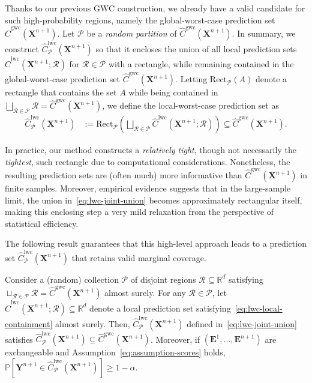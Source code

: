 {Thanks to our previous GWC construction, we already have a valid candidate for such high-probability regions, namely the global-worst-case prediction set $\hat{C}^{\mathrm{gwc}}(\mathbf{X}^{n+1})$. Let $\mathcal{P}$ be a {\em random partition} of $\hat{C}^{\mathrm{gwc}}(\mathbf{X}^{n+1})$. In summary, we construct $\hat{C}^{\mathrm{lwc}}_{\mathcal{P}}(\mathbf{X}^{n+1})$ so that it encloses the union of all local prediction sets $\hat{C}^\mathrm{lwc}(\mathbf{X}^{n+1}; \mathcal{R})$ for $\mathcal{R} \in \mathcal{P}$ with a rectangle, while remaining contained in the global-worst-case prediction set $\hat{C}^{\mathrm{gwc}}(\mathbf{X}^{n+1})$. Letting $\mathrm{Rect}_{\mathcal{P}}(A)$ denote a rectangle that contains the set $A$ while being contained in $\bigsqcup_{\mathcal{R} \in \mathcal{P}}\mathcal{R} = \hat{C}^{\mathrm{gwc}}(\mathbf{X}^{n+1})$, we define the local-worst-case prediction set as
\begin{equation}
    \begin{aligned}
        \hat{C}^{\mathrm{lwc}}_\mathcal{P}(\mathbf{X}^{n+1}) &:= \mathrm{Rect}_{\mathcal{P}}\left(\bigsqcup_{\mathcal{R} \in \mathcal{P}} \hat{C}^\mathrm{lwc}(\mathbf{X}^{n+1}; \mathcal{R})\right) \subseteq \hat{C}^{\mathrm{gwc}}(\mathbf{X}^{n+1}).
    \label{eq:lwc-joint-union}
    \end{aligned}
\end{equation}
}

In practice, our method constructs a {\em relatively tight}, though not necessarily the {\em tightest}, such rectangle due to computational considerations. Nonetheless, the resulting prediction sets are (often much) more informative than $\hat{C}^{\mathrm{gwc}}(\mathbf{X}^{n+1})$ in finite samples. Moreover, empirical evidence suggests that in the large-sample limit, the union in~\eqref{eq:lwc-joint-union} becomes approximately rectangular itself, making this enclosing step a very mild relaxation from the perspective of statistical efficiency.

The following result guarantees that this high-level approach leads to a prediction set $\hat{C}^{\mathrm{lwc}}_\mathcal{P}(\mathbf{X}^{n+1})$ that retains valid marginal coverage.
\begin{proposition}
Consider a (random) collection $\mathcal{P}$ of disjoint regions $\mathcal{R} \subseteq \mathbb{R}^d$ satisfying $\sqcup_{\mathcal{R} \in \mathcal{P} } \mathcal{R} = \hat{C}^{\mathrm{gwc}}(\mathbf{X}^{n+1})$ almost surely.
For any $\mathcal{R} \in \mathcal{P}$, let $\hat{C}^\mathrm{lwc}(\mathbf{X}^{n+1}; \mathcal{R}) \subseteq \mathbb{R}^d$ denote a local prediction set satisfying~\eqref{eq:lwc-local-containment} almost surely.
Then, $\hat{C}^{\mathrm{lwc}}_\mathcal{P}(\mathbf{X}^{n+1})$ defined in~\eqref{eq:lwc-joint-union}  satisfies $\hat{C}^{\mathrm{lwc}}_\mathcal{P}(\mathbf{X}^{n+1}) \subseteq \hat{C}^{\mathrm{gwc}}(\mathbf{X}^{n+1})$.
Moreover, if $(\mathbf{E}^1,\ldots,\mathbf{E}^{n+1})$ are exchangeable and Assumption~\ref{eq:assumption-scores} holds, $\mathbb{P}[ \mathbf{Y}^{n+1} \in \hat{C}^{\mathrm{lwc}}_\mathcal{P}(\mathbf{X}^{n+1}) ] \ge 1 - \alpha$.
\label{prop:lwc-approximation}
\end{proposition}

